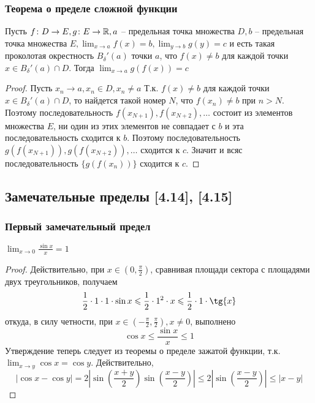 \documentclass[12pt, a4paper]{article}
\begin{document}
    \subsubsection{Теорема о пределе сложной функции}
    Пусть $f \colon D \to E, g \colon E \to \mathbb{R}, a$ -- предельная точка множества $D, b$ -- предельная точка множества $E, \lim_{x \to a} f(x) = b, \lim_{y \to b} g(y) = c$ и есть такая проколотая окрестность $B_{\delta}' (a)$ точки $a$, что $f(x) \ne b$ для каждой точки $x \in B_{\delta}'(a) \cap D$. Тогда $\lim_{x \to a} g(f(x)) = c$
    \begin{proof}
    Пусть $x_n \to a, x_n \in D, x_n \ne a$ Т.к. $f(x) \ne b$ для каждой точки $x \in B_{\delta}'(a) \cap D$, то найдется такой номер $N$, что $f(x_n) \ne b$ при $n > N$. Поэтому последовательность $f(x_{N + 1}), f(x_{N + 2}), \dots$ состоит из элементов множества $E$, ни один из этих элементов не совпадает с $b$ и эта последовательность сходится к $b$. Поэтому последовательность $g(f(x_{N + 1})), g(f(x_{N + 2})), \dots$ сходится к $c$. Значит и всяс последовательность $\{g(f(x_n))\}$ сходится к $c$.
    \end{proof}
    \subsection{Замечательные пределы [4.14], [4.15]}
    \subsubsection{Первый замечательный предел}
    $\lim_{x \to 0} \frac{\sin x}{x} = 1$
    \begin{proof}
    Действительно, при $x \in (0, \frac{\pi}{2})$, сравнивая площади сектора с площадями двух треугольников, получаем 
    \begin{equation*}
        \frac{1}{2} \cdot 1 \cdot 1 \cdot \sin{x} \leq \frac{1}{2} \cdot 1^2 \cdot x \leq \frac{1}{2} \cdot 1 \cdot \tg{x}
    \end{equation*}
    откуда, в силу четности, при $x \in (-\frac{\pi}{2}, \frac{\pi}{2}), x \ne 0$, выполнено
    \begin{equation*}
        \cos{x} \leq \frac{\sin{x}}{x} \leq 1
    \end{equation*}
    Утверждение теперь следует из теоремы о пределе зажатой функции, т.к. $\lim_{x \to y} \cos{x} = \cos{y}$. Действительно, 
    \begin{equation*}
        |\cos{x} - \cos{y}| = 2 \left|\sin{\left(\frac{x + y}{2}\right)} \sin{\left(\frac{x - y}{2}\right)}\right| \leq 2 \left|\sin{\left(\frac{x - y}{2}\right)}\right| \leq |x - y|
    \end{equation*}
    \end{proof}
\end{document}
